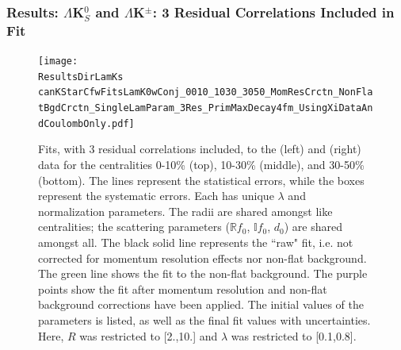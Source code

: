 \documentclass[../AnalysisNoteJBuxton.tex]{subfiles}
\begin{document}
\subsubsection{Results: \texorpdfstring{$\Lambda$K$^{0}_{S}$ and $\Lambda$K$^{\pm}$: 3 Residual Correlations Included in Fit}{TEXT}}
\label{ResultsLamK_3Res}


\begin{figure}[h]
  \centering
  \texttt{[image: \\ResultsDirLamKs canKStarCfwFitsLamK0wConj\_0010\_1030\_3050\_MomResCrctn\_NonFlatBgdCrctn\_SingleLamParam\_3Res\_PrimMaxDecay4fm\_UsingXiDataAndCoulombOnly.pdf]}
  \caption[\LamALamKs Fits with 3 Residuals]{Fits, with 3 residual correlations included, to the \LamKs (left) and \ALamKs (right) data for the centralities 0-10\% (top), 10-30\% (middle), and 30-50\% (bottom).
The lines represent the statistical errors, while the boxes represent the systematic errors.
Each has unique $\lambda$ and normalization parameters.
The radii are shared amongst like centralities; the scattering parameters ($\mathbb{R}f_{0}$, $\mathbb{I}f_{0}$, $d_{0}$) are shared amongst all.
The black solid line represents the ``raw" fit, i.e. not corrected for momentum resolution effects nor non-flat background.  
The green line shows the fit to the non-flat background.
The purple points show the fit after momentum resolution and non-flat background corrections have been applied.
The initial values of the parameters is listed, as well as the final fit values with uncertainties.
Here, $R$ was restricted to [2.,10.] and $\lambda$ was restricted to [0.1,0.8].}
  \label{fig:LamK0wConjFits_3Res}
\end{figure}

\end{document}
